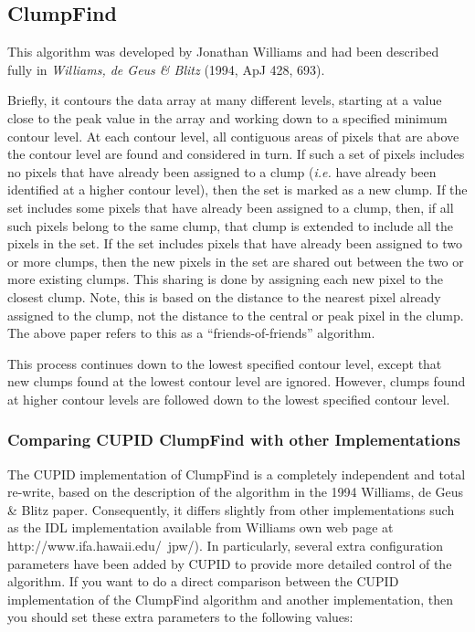 \documentclass[twoside,11pt]{article}
\newcommand{\htmladdnormallink}[2]{#1}
\newcommand{\xlabel}[1]{}
\renewcommand{\_}{\texttt{\symbol{95}}}
\begin{document}
\subsection{\xlabel{clumpfind}ClumpFind}
This algorithm was developed by Jonathan Williams and had been described
fully in \emph{Williams, de Geus \& Blitz} (1994, ApJ 428, 693).

Briefly, it contours the data array at many different levels, starting at
a value close to the peak value in the array and working down to a
specified minimum contour level. At each contour level, all contiguous
areas of pixels that are above the contour level are found and considered
in turn. If such a set of pixels includes no pixels that have already
been assigned to a clump (\emph{i.e.} have already been identified at a
higher contour level), then the set is marked as a new clump. If the set
includes some pixels that have already been assigned to a clump, then, if
all such pixels belong to the same clump, that clump is extended to
include all the pixels in the set. If the set includes pixels that have
already been assigned to two or more clumps, then the new pixels in the
set are shared out between the two or more existing clumps. This sharing
is done by assigning each new pixel to the closest clump. Note, this is
based on the distance to the nearest pixel already assigned to the clump,
not the distance to the central or peak pixel in the clump. The above
paper refers to this as a ``friends-of-friends'' algorithm.

This process continues down to the lowest specified contour level, except
that new clumps found at the lowest contour level are ignored. However,
clumps found at higher contour levels are followed down to the lowest
specified contour level.

\subsubsection{Comparing CUPID ClumpFind with other Implementations}
The CUPID implementation of ClumpFind is a completely independent
and total re-write, based on the description of the algorithm in the 1994 
Williams, de Geus \& Blitz paper. Consequently, it differs slightly from 
other implementations such as the IDL implementation available from
Williams own web page at \htmladdnormallink{http://www.ifa.hawaii.edu/~jpw/}
{http://www.ifa.hawaii.edu/~jpw/}). In particularly, several extra
configuration parameters have been added by CUPID to provide more
detailed control of the algorithm. If you want to do a direct comparison
between the CUPID implementation of the ClumpFind algorithm and another
implementation, then you should set these extra parameters to the
following values:
\end{document}

